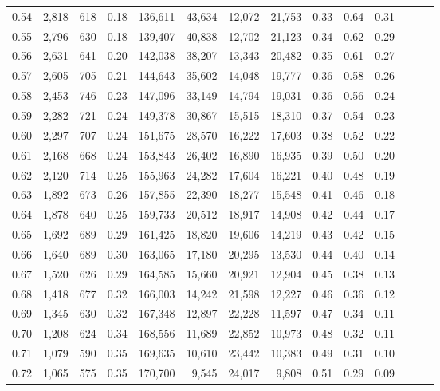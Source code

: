 \begin{tabular}{rrrrrrrrrrrrrr}
0.54 &  2,818 &  618 &  0.18 &  136,611 &   43,634 &  12,072 &  21,753 &  0.33 &  0.64 &      0.31 \\
0.55 &  2,796 &  630 &  0.18 &  139,407 &   40,838 &  12,702 &  21,123 &  0.34 &  0.62 &      0.29 \\
0.56 &  2,631 &  641 &  0.20 &  142,038 &   38,207 &  13,343 &  20,482 &  0.35 &  0.61 &      0.27 \\
0.57 &  2,605 &  705 &  0.21 &  144,643 &   35,602 &  14,048 &  19,777 &  0.36 &  0.58 &      0.26 \\
0.58 &  2,453 &  746 &  0.23 &  147,096 &   33,149 &  14,794 &  19,031 &  0.36 &  0.56 &      0.24 \\
0.59 &  2,282 &  721 &  0.24 &  149,378 &   30,867 &  15,515 &  18,310 &  0.37 &  0.54 &      0.23 \\
0.60 &  2,297 &  707 &  0.24 &  151,675 &   28,570 &  16,222 &  17,603 &  0.38 &  0.52 &      0.22 \\
0.61 &  2,168 &  668 &  0.24 &  153,843 &   26,402 &  16,890 &  16,935 &  0.39 &  0.50 &      0.20 \\
0.62 &  2,120 &  714 &  0.25 &  155,963 &   24,282 &  17,604 &  16,221 &  0.40 &  0.48 &      0.19 \\
0.63 &  1,892 &  673 &  0.26 &  157,855 &   22,390 &  18,277 &  15,548 &  0.41 &  0.46 &      0.18 \\
0.64 &  1,878 &  640 &  0.25 &  159,733 &   20,512 &  18,917 &  14,908 &  0.42 &  0.44 &      0.17 \\
0.65 &  1,692 &  689 &  0.29 &  161,425 &   18,820 &  19,606 &  14,219 &  0.43 &  0.42 &      0.15 \\
0.66 &  1,640 &  689 &  0.30 &  163,065 &   17,180 &  20,295 &  13,530 &  0.44 &  0.40 &      0.14 \\
0.67 &  1,520 &  626 &  0.29 &  164,585 &   15,660 &  20,921 &  12,904 &  0.45 &  0.38 &      0.13 \\
0.68 &  1,418 &  677 &  0.32 &  166,003 &   14,242 &  21,598 &  12,227 &  0.46 &  0.36 &      0.12 \\
0.69 &  1,345 &  630 &  0.32 &  167,348 &   12,897 &  22,228 &  11,597 &  0.47 &  0.34 &      0.11 \\
0.70 &  1,208 &  624 &  0.34 &  168,556 &   11,689 &  22,852 &  10,973 &  0.48 &  0.32 &      0.11 \\
0.71 &  1,079 &  590 &  0.35 &  169,635 &   10,610 &  23,442 &  10,383 &  0.49 &  0.31 &      0.10 \\
0.72 &  1,065 &  575 &  0.35 &  170,700 &    9,545 &  24,017 &   9,808 &  0.51 &  0.29 &      0.09 \\

\end{tabular}
